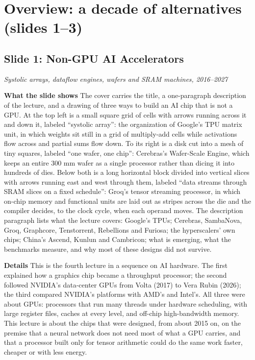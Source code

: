 \documentclass[11pt,letterpaper]{article}
\newcommand{\slide}[3]{%
  \subsection[Slide #1: #2]{Slide #1: #2}%
  {\color{muted}\itshape #3\par}\medskip}
\newcommand{\para}[1]{\medskip\noindent\textbf{#1}\quad}
\begin{document}
\section{Overview: a decade of alternatives (slides 1--3)}

\slide{1}{Non-GPU AI Accelerators}{Systolic arrays, dataflow engines, wafers and SRAM machines, 2016--2027}

\para{What the slide shows} The cover carries the title, a one-paragraph description of the lecture, and a drawing of three ways to build an AI chip that is not a GPU. At the top left is a small square grid of cells with arrows running across it and down it, labeled ``systolic array'': the organization of Google's TPU matrix unit, in which weights sit still in a grid of multiply-add cells while activations flow across and partial sums flow down. To its right is a disk cut into a mesh of tiny squares, labeled ``one wafer, one chip'': Cerebras's Wafer-Scale Engine, which keeps an entire 300 mm wafer as a single processor rather than dicing it into hundreds of dies. Below both is a long horizontal block divided into vertical slices with arrows running east and west through them, labeled ``data streams through SRAM slices on a fixed schedule'': Groq's tensor streaming processor, in which on-chip memory and functional units are laid out as stripes across the die and the compiler decides, to the clock cycle, when each operand moves. The description paragraph lists what the lecture covers: Google's TPUs; Cerebras, SambaNova, Groq, Graphcore, Tenstorrent, Rebellions and Furiosa; the hyperscalers' own chips; China's Ascend, Kunlun and Cambricon; what is emerging, what the benchmarks measure, and why most of these designs did not survive.

\para{Details} This is the fourth lecture in a sequence on AI hardware. The first explained how a graphics chip became a throughput processor; the second followed NVIDIA's data-center GPUs from Volta (2017) to Vera Rubin (2026); the third compared NVIDIA's platforms with AMD's and Intel's. All three were about GPUs: processors that run many threads under hardware scheduling, with large register files, caches at every level, and off-chip high-bandwidth memory. This lecture is about the chips that were designed, from about 2015 on, on the premise that a neural network does not need most of what a GPU carries, and that a processor built only for tensor arithmetic could do the same work faster, cheaper or with less energy.
\end{document}
